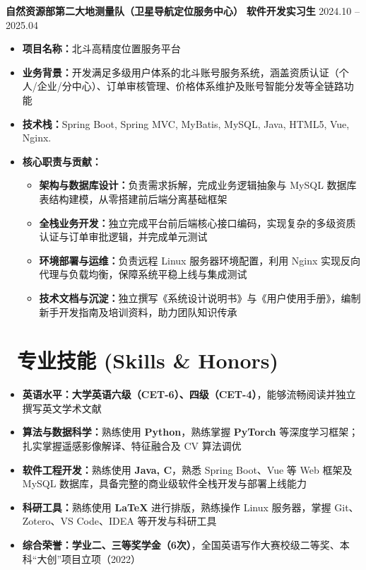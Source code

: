 \documentclass[9pt]{article}
\begin{document}
\textbf{自然资源部第二大地测量队（卫星导航定位服务中心）} \hfill \textbf{软件开发实习生} \hfill 2024.10 -- 2025.04
\begin{itemize}[nosep, leftmargin=*]
    \item \textbf{项目名称：}北斗高精度位置服务平台
    \item \textbf{业务背景：}开发满足多级用户体系的北斗账号服务系统，涵盖资质认证（个人/企业/分中心）、订单审核管理、价格体系维护及账号智能分发等全链路功能
    \item \textbf{技术栈：}Spring Boot, Spring MVC, MyBatis, MySQL, Java, HTML5, Vue, Nginx.
    \item \textbf{核心职责与贡献：}
    \begin{itemize}[label=$\circ$, leftmargin=1em]
        \item \textbf{架构与数据库设计：}负责需求拆解，完成业务逻辑抽象与 MySQL 数据库表结构建模，从零搭建前后端分离基础框架
        \item \textbf{全栈业务开发：}独立完成平台前后端核心接口编码，实现复杂的多级资质认证与订单审批逻辑，并完成单元测试
        \item \textbf{环境部署与运维：}负责远程 Linux 服务器环境配置，利用 Nginx 实现反向代理与负载均衡，保障系统平稳上线与集成测试
        \item \textbf{技术文档与沉淀：}独立撰写《系统设计说明书》与《用户使用手册》，编制新手开发指南及培训资料，助力团队知识传承
    \end{itemize}
\end{itemize}


\section{\makebox[\widthof{\faWrench}][c]{\color{CVBlue}\faWrench}\ 专业技能 (Skills \& Honors)}

\begin{itemize}[nosep, leftmargin=*]
    \item \textbf{英语水平：}\textbf{大学英语六级（CET-6）、四级（CET-4）}，能够流畅阅读并独立撰写英文学术文献
    \item \textbf{算法与数据科学：}熟练使用 \textbf{Python}，熟练掌握 \textbf{PyTorch} 等深度学习框架；扎实掌握遥感影像解译、特征融合及 CV 算法调优
    \item \textbf{软件工程开发：}熟练使用 \textbf{Java, C}，熟悉 Spring Boot、Vue 等 Web 框架及 MySQL 数据库，具备完整的商业级软件全栈开发与部署上线能力
    \item \textbf{科研工具：}熟练使用 \textbf{LaTeX} 进行排版，熟练操作 Linux 服务器，掌握 Git、Zotero、VS Code、IDEA 等开发与科研工具
    \item \textbf{综合荣誉：}\textbf{学业二、三等奖学金（6次）}，全国英语写作大赛校级二等奖、本科“大创”项目立项（2022）
\end{itemize}
\end{document}
